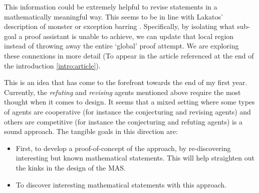 This information could be extremely helpful to revise statements in a mathematically meaningful way. This seems to be in line with Lakatos' description of monster or exception barring \cite{Lakatos_Worrall_Zahar_1976}. Specifically, by isolating what sub-goal a proof assistant is unable to achieve, we can update that local region instead of throwing away the entire `global' proof attempt. We are exploring these connexions in more detail (To appear in the article referenced at the end of the introduction \ref{intro:article}).
\par
This is an idea that has come to the forefront towards the end of my first year. Currently, the \textit{refuting} and \textit{revising} agents mentioned above require the most thought when it comes to design. It seems that a mixed setting where some types of agents are cooperative (for instance the conjecturing and revising agents) and others are competitive (for instance the conjecturing and refuting agents) is a sound approach.  The tangible goals in this direction are: 
\begin{itemize}
    \item First, to develop a proof-of-concept of the approach, by re-discovering interesting but known mathematical statements. This will help straighten out the kinks in the design of the MAS.
    \item To discover interesting mathematical statements with this approach.
\end{itemize}
